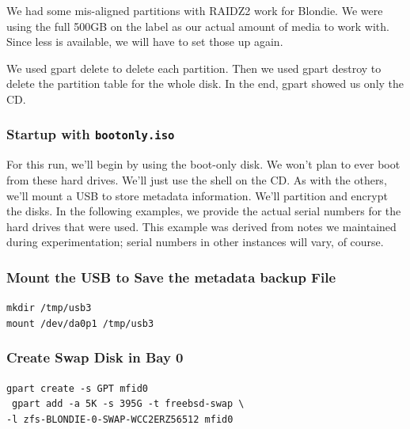 We had some mis-aligned partitions with RAIDZ2 work for Blondie.  We were using the full 500GB on the label as our actual amount of media to work with.  Since less is available, we will have to set those up again.

We used  gpart delete to delete each \gls{partition}.  Then we used  gpart destroy to delete the \gls{partition} table for the whole disk.  In the end,  gpart showed us only the CD.

\subsubsection{Startup with \texttt{bootonly.iso}}
For this run, we’ll begin by using the boot-only disk.  We won’t plan to ever boot from these hard drives.  We’ll just use the  \gls{shell} on the CD.  As with the others, we’ll mount a USB to store  \gls{metadata} information.  We’ll \gls{partition} and   \gls{encrypt} the disks.  In the following examples, we provide the actual serial numbers for the hard drives that were used.  This example was derived from notes we maintained during experimentation; serial numbers in other instances will vary, of course.

\subsubsection{Mount the USB to Save the  \Gls{metadata} \gls{backup} File}
\texttt{mkdir /tmp/usb3}\\
\texttt{mount /dev/da0p1 /tmp/usb3}

\subsubsection{Create Swap Disk in Bay 0}
\texttt{gpart create -s GPT mfid0}\\\
\texttt{gpart add -a 5K -s 395G -t freebsd-swap \textbackslash\\-l \gls{zfs}-BLONDIE-0-SWAP-WCC2ERZ56512 mfid0}

